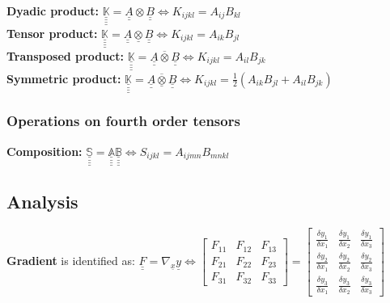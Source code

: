 \textbf{Dyadic product:} $\underline{\underline{\underline{\underline{\mathbb{K}}}}} = \underline{\underline{A}} \otimes \underline{\underline{B}} \Leftrightarrow K_{ijkl} = A_{ij}B_{kl}$ \\
\textbf{Tensor product:} $\underline{\underline{\underline{\underline{\mathbb{K}}}}} = \underline{\underline{A}} \underline{\otimes} \underline{\underline{B}} \Leftrightarrow K_{ijkl} = A_{ik}B_{jl}$ \\
\textbf{Transposed product:} $\underline{\underline{\underline{\underline{\mathbb{K}}}}} = \underline{\underline{A}} \overline{\otimes} \underline{\underline{B}} \Leftrightarrow K_{ijkl} = A_{il}B_{jk}$ \\
\textbf{Symmetric product:} $\underline{\underline{\underline{\underline{\mathbb{K}}}}} = \underline{\underline{A}} \underline{\overline{\otimes}} \underline{\underline{B}} \Leftrightarrow
K_{ijkl} = \frac{1}{2}(A_{ik}B_{jl} + A_{il}B_{jk})$ \\

\subsubsection*{Operations on fourth order tensors}

\textbf{Composition:} $\underline{\underline{\underline{\underline{\mathbb{S}}}}} = \underline{\underline{\underline{\underline{\mathbb{A}}}}}\underline{\underline{\underline{\underline{\mathbb{B}}}}}
 \Leftrightarrow S_{ijkl} = A_{ijmn}B_{mnkl}$ \\


\subsection*{Analysis}
\smallskip

\textbf{Gradient} is identified as: $\underline{\underline{F}} = \nabla_{\underline{x}} \underline{y} \Leftrightarrow \left[\begin{smallmatrix} F_{11} & F_{12} & F_{13} \\F_{21} & F_{22} & F_{23} \\F_{31} & F_{32} & F_{33}\end{smallmatrix}\right] = \left[\begin{smallmatrix} \frac{\delta y_1}{\delta x_1} & \frac{\delta y_1}{\delta x_2} & \frac{\delta y_1}{\delta x_3} \\ \frac{\delta y_2}{\delta x_1} & \frac{\delta y_2}{\delta x_2} & \frac{\delta y_2}{\delta x_3} \\ \frac{\delta y_3}{\delta x_1} & \frac{\delta y_3}{\delta x_2} & \frac{\delta y_3}{\delta x_3} \end{smallmatrix}\right]$ \\

